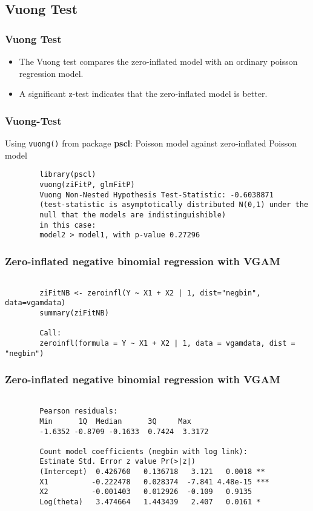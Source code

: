 \documentclass{beamer}
\begin{document}
	\subsection*{Vuong Test}
	\begin{frame}
		\frametitle{Vuong Test}
		\begin{itemize}
			\item The Vuong test compares the zero-inflated model with an ordinary poisson regression model.
			\item  A significant z-test indicates that the zero-inflated model is better.
		\end{itemize}
	\end{frame}
	\begin{frame}[fragile]
		\frametitle{Vuong-Test}
		Using \texttt{vuong()} from package \textbf{pscl}: Poisson model against zero-inflated Poisson model
		\begin{verbatim}
		library(pscl)
		vuong(ziFitP, glmFitP)
		Vuong Non-Nested Hypothesis Test-Statistic: -0.6038871 
		(test-statistic is asymptotically distributed N(0,1) under the
		null that the models are indistinguishible)
		in this case:
		model2 > model1, with p-value 0.27296 
		\end{verbatim}
	\end{frame}
	\begin{frame}[fragile]
		\frametitle{Zero-inflated negative binomial regression with VGAM}
		\begin{verbatim}
		
		ziFitNB <- zeroinfl(Y ~ X1 + X2 | 1, dist="negbin", data=vgamdata)
		summary(ziFitNB)
		
		Call:
		zeroinfl(formula = Y ~ X1 + X2 | 1, data = vgamdata, dist = "negbin")
		\end{verbatim}
	\end{frame}
	\begin{frame}[fragile]
		\frametitle{Zero-inflated negative binomial regression with VGAM}
		\begin{verbatim}
		
		Pearson residuals:
		Min      1Q  Median      3Q     Max 
		-1.6352 -0.8709 -0.1633  0.7424  3.3172 
		
		Count model coefficients (negbin with log link):
		Estimate Std. Error z value Pr(>|z|)    
		(Intercept)  0.426760   0.136718   3.121   0.0018 ** 
		X1          -0.222478   0.028374  -7.841 4.48e-15 ***
		X2          -0.001403   0.012926  -0.109   0.9135    
		Log(theta)   3.474664   1.443439   2.407   0.0161 *  
		\end{verbatim}
	\end{frame}
\end{document}
